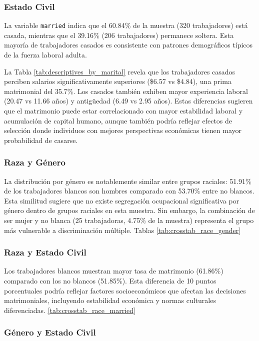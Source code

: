 \documentclass[12pt]{article}
\begin{document}
\subsubsection*{Estado Civil}

La variable \texttt{married} indica que el 60.84\% de la muestra (320 trabajadores) está casada, mientras que el 39.16\% (206 trabajadores) permanece soltera. Esta mayoría de trabajadores casados es consistente con patrones demográficos típicos de la fuerza laboral adulta.

La Tabla \ref{tab:descriptives_by_marital} revela que los trabajadores casados perciben salarios significativamente superiores (\$6.57 vs \$4.84), una prima matrimonial del 35.7\%. Los casados también exhiben mayor experiencia laboral (20.47 vs 11.66 años) y antigüedad (6.49 vs 2.95 años). Estas diferencias sugieren que el matrimonio puede estar correlacionado con mayor estabilidad laboral y acumulación de capital humano, aunque también podría reflejar efectos de selección donde individuos con mejores perspectivas económicas tienen mayor probabilidad de casarse.

\subsubsection*{Raza y Género}

La distribución por género es notablemente similar entre grupos raciales: 51.91\% de los trabajadores blancos son hombres comparado con 53.70\% entre no blancos. Esta similitud sugiere que no existe segregación ocupacional significativa por género dentro de grupos raciales en esta muestra. Sin embargo, la combinación de ser mujer y no blanca (25 trabajadoras, 4.75\% de la muestra) representa el grupo más vulnerable a discriminación múltiple. Tablas \ref{tab:crosstab_race_gender}

\subsubsection*{Raza y Estado Civil}

Los trabajadores blancos muestran mayor tasa de matrimonio (61.86\%) comparado con los no blancos (51.85\%). Esta diferencia de 10 puntos porcentuales podría reflejar factores socioeconómicos que afectan las decisiones matrimoniales, incluyendo estabilidad económica y normas culturales diferenciadas. \ref{tab:crosstab_race_married}

\subsubsection*{Género y Estado Civil}
\end{document}
